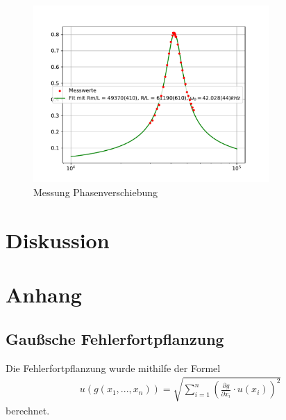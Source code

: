 \documentclass[11pt, a4paper]{article}
\begin{document}
    \begin{figure}
        \centering
        \includegraphics[width=0.8\textwidth]{schwdurch.pdf}
        \caption{Messung Phasenverschiebung}
        \label{fig:schwphas}
    \end{figure}




    

    \section{Diskussion}

    \section{Anhang}
    \subsection{Gaußsche Fehlerfortpflanzung}
    Die Fehlerfortpflanzung wurde mithilfe der Formel
    \begin{align}
        u\left(g \left(x_1, ..., x_n\right)\right) = \sqrt{\sum_{i=1}^n \left( \frac{\partial g }{\partial x_i} \cdot u\left(x_i\right) \right)^2} \label{gauss}
    \end{align}
    berechnet.

    
    
\end{document}
